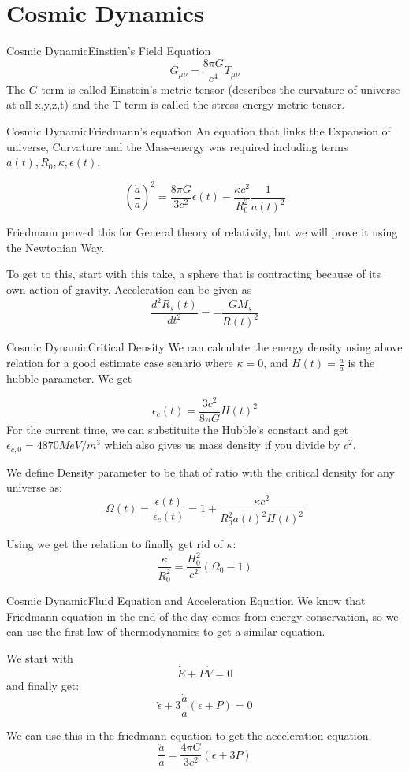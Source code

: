 \section{Cosmic Dynamics}

\begin{frame}{Cosmic Dynamic}{Einstien's Field Equation}
	$$ G_{\mu \nu} = \frac{8\pi G}{c^4} T_{\mu \nu} $$
	The $G$ term is called Einstein's metric tensor (describes the curvature
	of universe at all x,y,z,t) and the T term is called
	the stress-energy metric tensor.
\end{frame}

\begin{frame}{Cosmic Dynamic}{Friedmann's equation}
	An equation that links the Expansion of universe, Curvature and the
	Mass-energy was required including terms $a(t), R_0, \kappa,
	\epsilon(t)$.


	$$ \left( \frac{\dot a}{a} \right)^2 = \frac{8\pi G}{3c^2}\epsilon(t) -
	\frac{\kappa c^2}{R_0^2} \frac{1}{a(t)^2}$$

	Friedmann proved this for General theory of relativity, but we will
	prove it using the Newtonian Way.

	To get to this, start with this take, a sphere that is contracting
	because of its own action of gravity. Acceleration can be given as
	$$ \frac{d^2R_s(t)}{dt^2} = - \frac{GM_s}{R(t)^2} $$


\end{frame}

\begin{frame}{Cosmic Dynamic}{Critical Density}
	We can calculate the energy density using above relation for a good
	estimate case senario where $\kappa = 0$, and $H(t) = \frac{\dot a}{a}$
	is the hubble parameter. We get

	$$ \epsilon_c(t) = \frac{3c^2}{8\pi G} H(t)^2  $$
	For the current time, we can substituite the Hubble's constant and get
	$\epsilon_{c,0} = 4870 MeV/m^3$ which also gives us mass density if you
	divide by $c^2$.

	We define Density parameter to be that of ratio with the critical
	density for any universe as:
	$$ \Omega (t)  = \frac{\epsilon(t)}{\epsilon_c(t)} = 1 + \frac{\kappa
	c^2}{R_0^2 a(t)^2 H(t)^2} $$

	Using we get the relation to finally get rid of $\kappa$:
	$$ \frac{\kappa}{R_0^2} = \frac{H_0^2}{c^2} (\Omega_0 - 1) $$
\end{frame}


\begin{frame}{Cosmic Dynamic}{Fluid Equation and Acceleration Equation}
	We know that Friedmann equation in the end of the day comes from energy
	conservation, so we can use the first law of  thermodynamics to get a
	similar equation.

	We start with
	$$ \dot E + P \dot V = 0 $$
	and finally get:
	$$ \dot \epsilon + 3 \frac{\dot a}{a} (\epsilon + P) = 0 $$

	We can use this in the friedmann equation to get the acceleration
	equation.
	$$ \frac{\ddot a}{a} = \frac{4\pi G}{3c^2}\left( \epsilon + 3P \right) $$
\end{frame}


